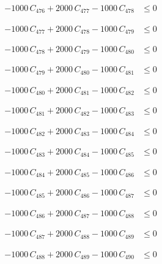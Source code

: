 \documentclass[a4paper,11pt]{article}
\begin{document}
\begin{align}
-1000\,C_{476} + 2000\,C_{477} - 1000\,C_{478} &\leq 0 \nonumber
\end{align}

\begin{align}
-1000\,C_{477} + 2000\,C_{478} - 1000\,C_{479} &\leq 0 \nonumber
\end{align}

\begin{align}
-1000\,C_{478} + 2000\,C_{479} - 1000\,C_{480} &\leq 0 \nonumber
\end{align}

\begin{align}
-1000\,C_{479} + 2000\,C_{480} - 1000\,C_{481} &\leq 0 \nonumber
\end{align}

\begin{align}
-1000\,C_{480} + 2000\,C_{481} - 1000\,C_{482} &\leq 0 \nonumber
\end{align}

\begin{align}
-1000\,C_{481} + 2000\,C_{482} - 1000\,C_{483} &\leq 0 \nonumber
\end{align}

\begin{align}
-1000\,C_{482} + 2000\,C_{483} - 1000\,C_{484} &\leq 0 \nonumber
\end{align}

\begin{align}
-1000\,C_{483} + 2000\,C_{484} - 1000\,C_{485} &\leq 0 \nonumber
\end{align}

\begin{align}
-1000\,C_{484} + 2000\,C_{485} - 1000\,C_{486} &\leq 0 \nonumber
\end{align}

\begin{align}
-1000\,C_{485} + 2000\,C_{486} - 1000\,C_{487} &\leq 0 \nonumber
\end{align}

\begin{align}
-1000\,C_{486} + 2000\,C_{487} - 1000\,C_{488} &\leq 0 \nonumber
\end{align}

\begin{align}
-1000\,C_{487} + 2000\,C_{488} - 1000\,C_{489} &\leq 0 \nonumber
\end{align}

\begin{align}
-1000\,C_{488} + 2000\,C_{489} - 1000\,C_{490} &\leq 0 \nonumber
\end{align}
\end{document}
